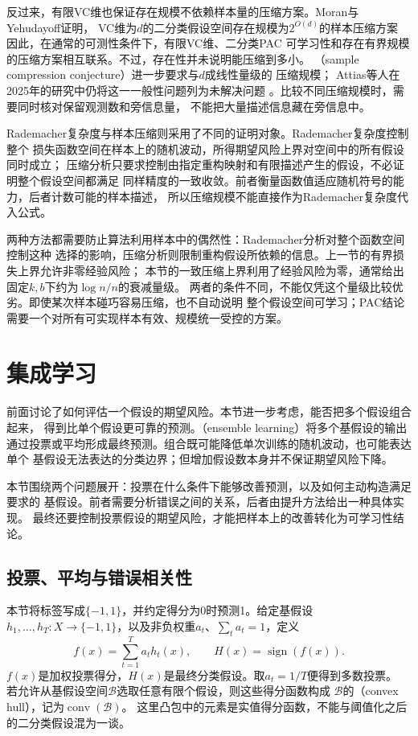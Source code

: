 反过来，有限VC维也保证存在规模不依赖样本量的压缩方案。Moran与Yehudayoff证明，
VC维为$d$的二分类假设空间存在规模为$2^{O(d)}$的样本压缩方案
 因此，在通常的可测性条件下，有限VC维、二分类PAC
可学习性和存在有界规模的压缩方案相互联系。不过，存在性并未说明能压缩到多小。
（sample compression conjecture）进一步要求与$d$成线性量级的
压缩规模；
Attias等人在2025年的研究中仍将这一一般性问题列为未解决问题
。比较不同压缩规模时，需要同时核对保留观测数和旁信息量，
不能把大量描述信息藏在旁信息中。

Rademacher复杂度与样本压缩则采用了不同的证明对象。Rademacher复杂度控制整个
损失函数空间在样本上的随机波动，所得期望风险上界对空间中的所有假设同时成立；
压缩分析只要求控制由指定重构映射和有限描述产生的假设，不必证明整个假设空间都满足
同样精度的一致收敛。前者衡量函数值适应随机符号的能力，后者计数可能的样本描述，
所以压缩规模不能直接作为Rademacher复杂度代入公式。

两种方法都需要防止算法利用样本中的偶然性：Rademacher分析对整个函数空间控制这种
选择的影响，压缩分析则限制重构假设所依赖的信息。上一节的有界损失上界允许非零经验风险；
本节的一致压缩上界利用了经验风险为零，通常给出固定$k,b$下约为$\log n/n$的衰减量级。
两者的条件不同，不能仅凭这个量级比较优劣。即使某次样本碰巧容易压缩，也不自动说明
整个假设空间可学习；PAC结论需要一个对所有可实现样本有效、规模统一受控的方案。

\section{集成学习}
\label{sec:boosting}

前面讨论了如何评估一个假设的期望风险。本节进一步考虑，能否把多个假设组合起来，
得到比单个假设更可靠的预测。（ensemble learning）将多个基假设的输出
通过投票或平均形成最终预测。组合既可能降低单次训练的随机波动，也可能表达单个
基假设无法表达的分类边界；但增加假设数本身并不保证期望风险下降。

本节围绕两个问题展开：投票在什么条件下能够改善预测，以及如何主动构造满足要求的
基假设。前者需要分析错误之间的关系，后者由提升方法给出一种具体实现。
最终还要控制投票假设的期望风险，才能把样本上的改善转化为可学习性结论。

\subsection{投票、平均与错误相关性}

本节将标签写成$\{-1,1\}$，并约定得分为0时预测1。给定基假设
$h_1,\ldots,h_T:X\to\{-1,1\}$，以及非负权重$a_t$、$\sum_ta_t=1$，定义
\[
 f(x)=\sum_{t=1}^T a_t h_t(x),\qquad H(x)=\operatorname{sign}(f(x)).
\]
$f(x)$是加权投票得分，$H(x)$是最终分类假设。取$a_t=1/T$便得到多数投票。
若允许从基假设空间$\mathcal B$选取任意有限个假设，则这些得分函数构成
$\mathcal B$的（convex hull），记为$\operatorname{conv}(\mathcal B)$。
这里凸包中的元素是实值得分函数，不能与阈值化之后的二分类假设混为一谈。

